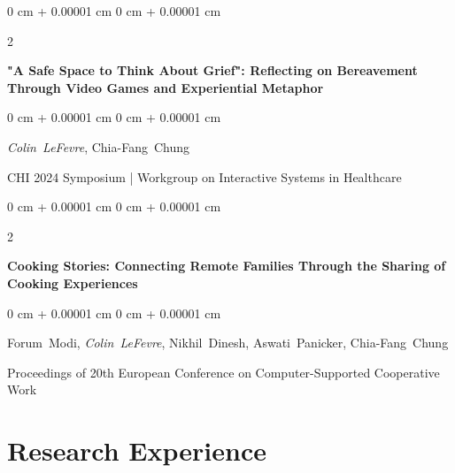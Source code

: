 \documentclass[10pt, letterpaper]{article}
\newenvironment{onecolentry}{
    \begin{adjustwidth}{
        0 cm + 0.00001 cm
    }{
        0 cm + 0.00001 cm
    }
}{
    \end{adjustwidth}
} %
\newenvironment{twocolentry}[2][]{
    \onecolentry
    \def\secondColumn{#2}
    \setcolumnwidth{\fill, 4.0 cm}
    \begin{paracol}{2}
}{
    \switchcolumn \raggedleft \secondColumn
    \end{paracol}
    \endonecolentry
} %
\begin{document}
        \vspace{0.21 cm}

        \begin{samepage}
            \begin{twocolentry}{
                2023
            }
                \textbf{"A Safe Space to Think About Grief": Reflecting on Bereavement Through Video Games and Experiential Metaphor}
            \end{twocolentry}

            \vspace{0.10 cm}
            
            \begin{onecolentry}
                \mbox{\textit{Colin LeFevre}}, \mbox{Chia-Fang Chung}

                \vspace{0.10 cm}
                
        CHI 2024 Symposium | Workgroup on Interactive Systems in Healthcare\end{onecolentry}
        \end{samepage}

        \vspace{0.21 cm}

        \begin{samepage}
            \begin{twocolentry}{
                2022
            }
                \textbf{Cooking Stories: Connecting Remote Families Through the Sharing of Cooking Experiences}
            \end{twocolentry}

            \vspace{0.10 cm}
            
            \begin{onecolentry}
                \mbox{Forum Modi}, \mbox{\textit{Colin LeFevre}}, \mbox{Nikhil Dinesh}, \mbox{Aswati Panicker}, \mbox{Chia-Fang Chung}

                \vspace{0.10 cm}
                
        Proceedings of 20th European Conference on Computer-Supported Cooperative Work\end{onecolentry}
        \end{samepage}


    
    \section{Research Experience}
\end{document}
